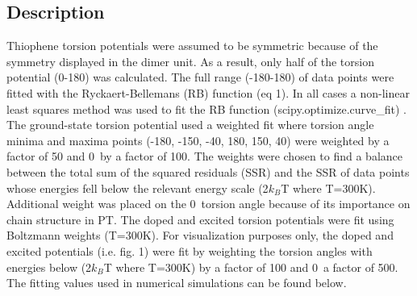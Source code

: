 \subsection{Description}
\label{subsec:TPF_descript}
Thiophene torsion potentials were assumed to be symmetric because of the symmetry displayed in the dimer unit. As a result, only half of the torsion potential (0-180\textdegree) was calculated. The full range (-180-180\textdegree) of data points were fitted with the Ryckaert-Bellemans (RB) function (eq 1). In all cases a non-linear least squares method was used to fit the RB function (scipy.optimize.curve\_fit) \cite{Jones}. The ground-state torsion potential used a weighted fit where torsion angle minima and maxima points (-180\textdegree, -150\textdegree, -40\textdegree, 180\textdegree, 150\textdegree, 40\textdegree) were weighted by a factor of 50 and 0\textdegree\ by a factor of 100. The weights were chosen to find a balance between the total sum of the squared residuals (SSR) and the SSR of data points whose energies fell below the relevant energy scale (2$k_B$T where T=300K). Additional weight was placed on the 0\textdegree\ torsion angle because of its importance on chain structure in PT. The doped and excited torsion potentials were fit using Boltzmann weights (T=300K). For visualization purposes only, the doped and excited potentials (i.e. fig. 1) were fit by weighting the torsion angles with energies below (2$k_B$T where T=300K) by a factor of 100 and 0\textdegree\ a factor of 500. The fitting values used in numerical simulations can be found below.

